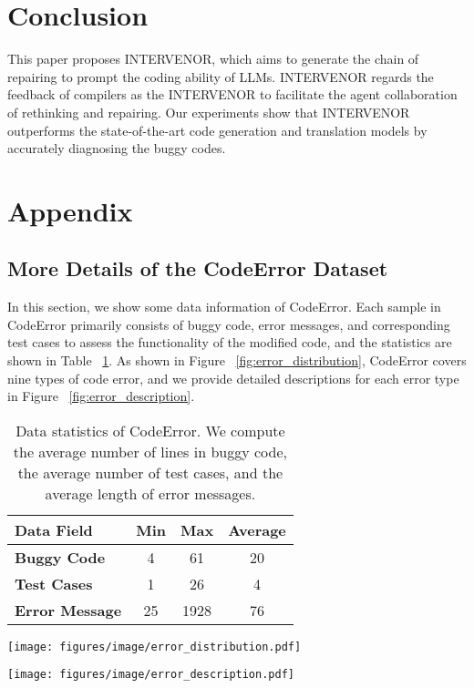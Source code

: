\documentclass[11pt]{article}
\begin{document}
 


\section{Conclusion}
This paper proposes INTERVENOR, which aims to generate the chain of repairing to prompt the coding ability of LLMs. INTERVENOR regards the feedback of compilers as the  INTERVENOR to facilitate the agent collaboration of rethinking and repairing. Our experiments show that INTERVENOR outperforms the state-of-the-art code generation and translation models by accurately diagnosing the buggy codes. 






\balance

\clearpage
\newpage
\appendix

\section{Appendix}
\subsection{More Details of the CodeError Dataset}\label{app:codeerror}
In this section, we show some data information of CodeError. Each sample in CodeError primarily consists of buggy code, error messages, and corresponding test cases to assess the functionality of the modified code, and the statistics are shown in Table ~\ref{tab:data_statistics}. As shown in Figure ~\ref{fig:error_distribution}, CodeError covers nine types of code error, and we provide detailed descriptions for each error type in Figure ~\ref{fig:error_description}.
\begin{table}[h]
\centering
\small
\caption{Data statistics of CodeError. We compute the average number of lines in buggy code, the average number of test cases, and the average length of error messages.}
\label{tab:data_statistics}
\begin{tabular}{l|ccc}
\hline
\textbf{Data Field}    & \textbf{Min} & \textbf{Max} & \textbf{Average} \\ \hline
\textbf{Buggy Code}    & 4            & 61           & 20           \\
\textbf{Test Cases}    & 1            & 26           & 4            \\
\textbf{Error Message} & 25           & 1928         & 76           \\ \hline
\end{tabular}
\end{table} 
\begin{figure*}[t] \centering
    \texttt{[image: figures/image/error\_distribution.pdf]}
    \caption{The distribution of error types in CodeError. CodeError covers a total of 9 code error types.} \label{fig:error_distribution}
\end{figure*}
 \begin{figure*}[t] \centering
    \texttt{[image: figures/image/error\_description.pdf]}
    \caption{Detailed descriptions of each error type in CodeError. We provide an overview of the causes behind each error.} \label{fig:error_description}
\end{figure*}
 
\end{document}
